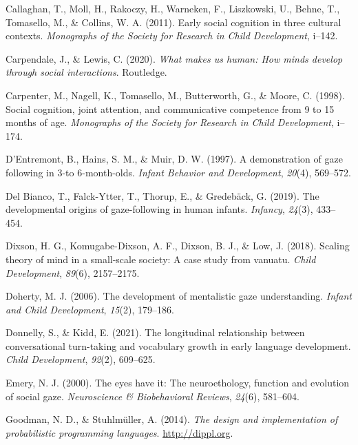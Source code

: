 \documentclass[
  man,floatsintext]{apa7}
\newlength{\cslhangindent}
\newenvironment{CSLReferences}[2] %
 {\begin{list}{}{%
  \setlength{\itemindent}{0pt}
  \setlength{\leftmargin}{0pt}
  \setlength{\parsep}{0pt}
  \ifodd #1
   \setlength{\leftmargin}{\cslhangindent}
   \setlength{\itemindent}{-1\cslhangindent}
  \fi
  \setlength{\itemsep}{#2\baselineskip}}}
 {\end{list}}
\begin{document}
\begin{CSLReferences}{1}{0}
Callaghan, T., Moll, H., Rakoczy, H., Warneken, F., Liszkowski, U., Behne, T., Tomasello, M., \& Collins, W. A. (2011). Early social cognition in three cultural contexts. \emph{Monographs of the Society for Research in Child Development}, i--142.

Carpendale, J., \& Lewis, C. (2020). \emph{What makes us human: How minds develop through social interactions}. Routledge.

Carpenter, M., Nagell, K., Tomasello, M., Butterworth, G., \& Moore, C. (1998). Social cognition, joint attention, and communicative competence from 9 to 15 months of age. \emph{Monographs of the Society for Research in Child Development}, i--174.

D'Entremont, B., Hains, S. M., \& Muir, D. W. (1997). A demonstration of gaze following in 3-to 6-month-olds. \emph{Infant Behavior and Development}, \emph{20}(4), 569--572.

Del Bianco, T., Falck-Ytter, T., Thorup, E., \& Gredebäck, G. (2019). The developmental origins of gaze-following in human infants. \emph{Infancy}, \emph{24}(3), 433--454.

Dixson, H. G., Komugabe-Dixson, A. F., Dixson, B. J., \& Low, J. (2018). Scaling theory of mind in a small-scale society: A case study from vanuatu. \emph{Child Development}, \emph{89}(6), 2157--2175.

Doherty, M. J. (2006). The development of mentalistic gaze understanding. \emph{Infant and Child Development}, \emph{15}(2), 179--186.

Donnelly, S., \& Kidd, E. (2021). The longitudinal relationship between conversational turn-taking and vocabulary growth in early language development. \emph{Child Development}, \emph{92}(2), 609--625.

Emery, N. J. (2000). The eyes have it: The neuroethology, function and evolution of social gaze. \emph{Neuroscience \& Biobehavioral Reviews}, \emph{24}(6), 581--604.

Goodman, N. D., \& Stuhlmüller, A. (2014). \emph{{The design and implementation of probabilistic programming languages}}. \url{http://dippl.org}.


\end{CSLReferences}
\end{document}

